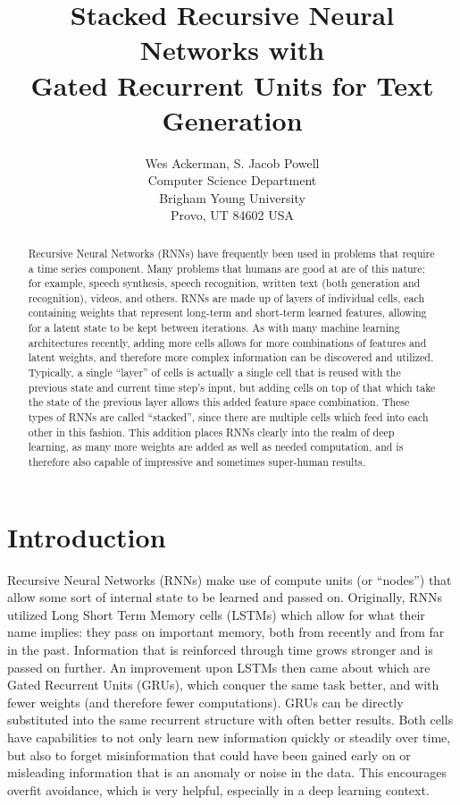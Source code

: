 \documentclass[letterpaper]{article}
\title{Stacked Recursive Neural Networks with \\
Gated Recurrent Units for Text Generation}
\author{Wes Ackerman, S. Jacob Powell\\
    Computer Science Department\\
    Brigham Young University\\
    Provo, UT 84602  USA\\
}
\begin{document}
\maketitle

\begin{abstract}
    Recursive Neural Networks (RNNs) have frequently been used in problems that require a time series component. Many
    problems that humans are good at are of this nature; for example, speech synthesis, speech recognition, written text
    (both generation and recognition), videos, and others. RNNs are made up of layers of individual cells, each
    containing weights that represent long-term and short-term learned features, allowing for a latent state to be kept
    between iterations. As with many machine learning architectures recently, adding more cells allows for more
    combinations of features and latent weights, and therefore more complex information can be discovered and utilized.
    Typically, a single ``layer'' of cells is actually a single cell that is reused with the previous state and current
    time step's input, but adding cells on top of that which take the state of the previous layer allows this added
    feature space combination. These types of RNNs are called ``stacked'', since there are multiple cells which feed
    into each other in this fashion. This addition places RNNs clearly into the realm of deep learning, as many more
    weights are added as well as needed computation, and is therefore also capable of impressive and sometimes
    super-human results.
\end{abstract}

\section{Introduction}
    Recursive Neural Networks (RNNs) make use of compute units (or ``nodes'') that allow some sort of internal state to
    be learned and passed on. Originally, RNNs utilized Long Short Term Memory cells (LSTMs) which allow for what their
    name implies: they pass on important memory, both from recently and from far in the past. Information that is
    reinforced through time grows stronger and is passed on further. An improvement upon LSTMs then came about which are
    Gated Recurrent Units (GRUs), which conquer the same task better, and with fewer weights (and therefore fewer
    computations).  GRUs can be directly substituted into the same recurrent structure with often better results. Both
    cells have capabilities to not only learn new information quickly or steadily over time, but also to forget
    misinformation that could have been gained early on or misleading information that is an anomaly or noise in the
    data. This encourages overfit avoidance, which is very helpful, especially in a deep learning context.
\end{document}
